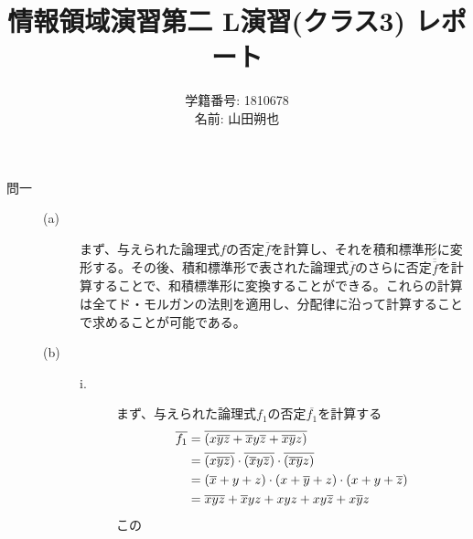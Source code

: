 \documentclass{jsarticle}
\title{情報領域演習第二 L演習(クラス3) レポート}
\author{学籍番号: 1810678 \\
        名前: 山田朔也}
\begin{document}
  \maketitle
  \begin{description}
      \item[問一]
      \begin{description}
          \item[(a)]
          まず、与えられた論理式$f$の否定$\overline{f}$を計算し、それを積和標準形に変形する。その後、積和標準形で表された論理式$\overline{f}$のさらに否定$\overline{\overline{f}}$を計算することで、和積標準形に変換することができる。これらの計算は全てド・モルガンの法則を適用し、分配律に沿って計算することで求めることが可能である。

          \item[(b)]
          \begin{description}
              \item[i.]
              まず、与えられた論理式$f_1$の否定$\overline{f_1}$を計算する
              \begin{align}
                  \overline{f_1} &= \overline{(x\overline{y}\overline{z} + \overline{x}y\overline{z} +  \overline{x}\overline{y}z)} \notag \\
                                 &= \overline{(x\overline{y}\overline{z})} \cdot \overline{(\overline{x}y\overline{z})} \cdot \overline{(\overline{x}\overline{y}z)} \notag \\
                                 &= (\overline{x}+y+z) \cdot (x+\overline{y}+z) \cdot (x+y+\overline{z}) \notag \\
                                 &= \overline{x}\overline{y}\overline{z} + \overline{x}yz + xyz + xy\overline{z} + x\overline{y}z
              \end{align}
              この
          \end{description}
      \end{description}

  \end{description}
\end{document}
